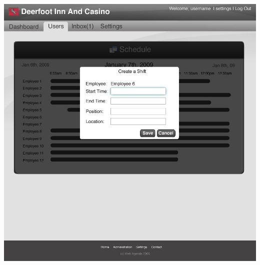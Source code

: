 \documentclass[letterpaper,12pt]{report}
\begin{document}
\begin{landscape}
\newpage
\begin{center}
 \includegraphics[scale=0.3]{prototypes/scheduleClickFillInfo.jpg}
\end{center}

\newpage

\end{landscape}
\end{document}
